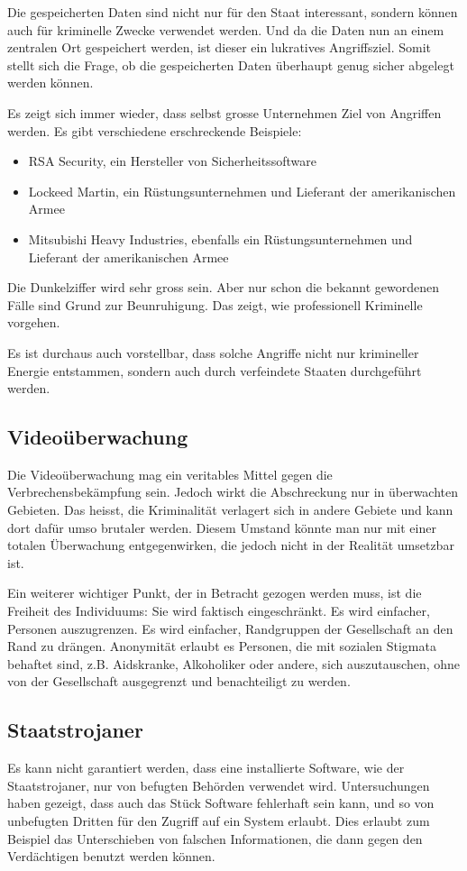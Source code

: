 Die gespeicherten Daten sind nicht nur für den Staat interessant,
sondern können auch für kriminelle Zwecke verwendet werden.
Und da die Daten nun an einem zentralen Ort gespeichert werden, ist
dieser ein lukratives Angriffsziel.
Somit stellt sich die Frage, ob die gespeicherten Daten
überhaupt genug sicher abgelegt werden können.

Es zeigt sich immer wieder, dass selbst grosse Unternehmen Ziel von Angriffen
werden. Es gibt verschiedene erschreckende Beispiele:
\begin{itemize}
\item RSA Security, ein Hersteller von Sicherheitssoftware
\item Lockeed Martin, ein Rüstungsunternehmen und Lieferant der amerikanischen Armee
\item Mitsubishi Heavy Industries, ebenfalls ein Rüstungsunternehmen und
Lieferant der amerikanischen Armee
\end{itemize}

Die Dunkelziffer wird sehr gross sein. Aber nur schon die bekannt gewordenen
Fälle sind Grund zur Beunruhigung. Das zeigt, wie professionell
Kriminelle vorgehen.

Es ist durchaus auch vorstellbar, dass solche Angriffe nicht nur krimineller
Energie entstammen, sondern auch durch verfeindete Staaten durchgeführt werden.

\subsection*{Videoüberwachung}
Die Videoüberwachung mag ein veritables Mittel gegen die Verbrechensbekämpfung sein.
Jedoch wirkt die Abschreckung nur in überwachten Gebieten.
Das heisst, die Kriminalität verlagert sich in andere Gebiete und
kann dort dafür umso brutaler werden.
Diesem Umstand könnte man nur mit einer totalen Überwachung entgegenwirken,
die jedoch nicht in der Realität umsetzbar ist.

Ein weiterer wichtiger Punkt, der in Betracht gezogen werden muss,
ist die Freiheit des Individuums: Sie wird faktisch eingeschränkt. 
Es wird einfacher, Personen auszugrenzen.
Es wird einfacher, Randgruppen der Gesellschaft an den Rand zu drängen.
Anonymität erlaubt es Personen, die mit sozialen Stigmata behaftet sind,
z.B. Aidskranke, Alkoholiker oder andere, sich auszutauschen, ohne von der
Gesellschaft ausgegrenzt und benachteiligt zu werden.

\subsection*{Staatstrojaner}
Es kann nicht garantiert werden, dass eine installierte Software,
wie der Staatstrojaner, nur von befugten Behörden verwendet wird. 
Untersuchungen haben gezeigt, dass auch das Stück Software fehlerhaft 
sein kann, und so von unbefugten Dritten für den Zugriff auf ein System 
erlaubt. Dies erlaubt zum Beispiel das
Unterschieben von falschen Informationen, die dann gegen
den Verdächtigen benutzt werden können.

